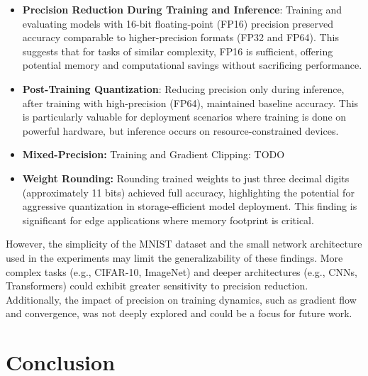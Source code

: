 \documentclass[11pt]{article}
\begin{document}
\begin{itemize}
	\item \textbf{Precision Reduction During Training and Inference}: Training and evaluating
	models with 16-bit floating-point (FP16) precision preserved accuracy comparable to
	higher-precision formats (FP32 and FP64). This suggests that for tasks of similar
	complexity, FP16 is sufficient, offering potential memory and computational savings
	without sacrificing performance.

	\item \textbf{Post-Training Quantization}: Reducing precision only during inference, after
	training with high-precision (FP64), maintained baseline accuracy. This is
	particularly valuable for deployment scenarios where training is done on powerful
	hardware, but inference occurs on resource-constrained devices.

	\item \textbf{Mixed-Precision:} Training and Gradient Clipping: TODO

	\item \textbf{Weight Rounding:} Rounding trained weights to just three decimal digits
	(approximately 11 bits) achieved full accuracy, highlighting the potential for
	aggressive quantization in storage-efficient model deployment. This finding is
	significant for edge applications where memory footprint is critical.
\end{itemize}

However, the simplicity of the MNIST dataset and the small network architecture used in
the experiments may limit the generalizability of these findings. More complex tasks
(e.g., CIFAR-10, ImageNet) and deeper architectures (e.g., CNNs, Transformers) could
exhibit greater sensitivity to precision reduction. Additionally, the impact of precision
on training dynamics, such as gradient flow and convergence, was not deeply explored and
could be a focus for future work.


\section{Conclusion}

\end{document}
